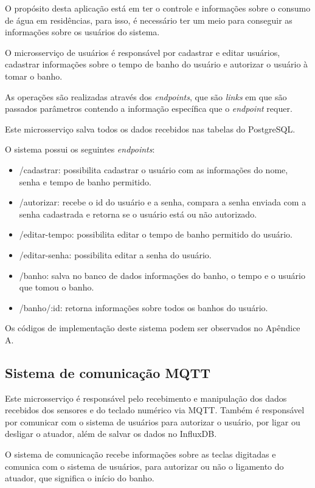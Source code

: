 O propósito desta aplicação está em ter o controle e informações sobre o consumo de água em residências, para isso, é necessário ter um meio para conseguir as informações sobre os usuários do sistema. 

O microsserviço de usuários é responsável por cadastrar e editar usuários, cadastrar informações sobre o tempo de banho do usuário e autorizar o usuário à tomar o banho.

As operações são realizadas através dos \textit{endpoints}, que são \textit{links} em que são passados parâmetros contendo a informação específica que o \textit{endpoint} requer.

Este microsserviço salva todos os dados recebidos nas tabelas do PostgreSQL.

O sistema possui os seguintes \textit{endpoints}:


\begin{itemize}
	\item /cadastrar: possibilita cadastrar o usuário com as informações do nome, senha e tempo de banho permitido.
	\item /autorizar: recebe o id do usuário e a senha, compara a senha enviada com a senha cadastrada e retorna se o usuário está ou não autorizado.
	\item /editar-tempo: possibilita editar o tempo de banho permitido do usuário.
	\item /editar-senha: possibilita editar a senha do usuário.
	\item /banho: salva no banco de dados informações do banho, o tempo e o usuário que tomou o banho.
	\item /banho/:id: retorna informações sobre todos os banhos do usuário.
\end{itemize}

Os códigos de implementação deste sistema podem ser observados no Apêndice A.

\subsection{Sistema de comunicação MQTT}

Este microsserviço é responsável pelo recebimento e manipulação dos dados recebidos dos sensores e do teclado numérico via MQTT. Também é responsável por comunicar com o sistema de usuários para autorizar o usuário, por ligar ou desligar o atuador, além de salvar os dados no InfluxDB.

O sistema de comunicação recebe informações sobre as teclas digitadas e comunica com o sistema de usuários, para autorizar ou não o ligamento do atuador, que significa o início do banho.

